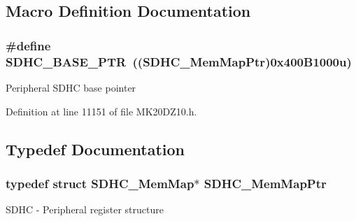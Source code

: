 \subsection{Macro Definition Documentation}
\subsubsection[{\texorpdfstring{S\+D\+H\+C\+\_\+\+B\+A\+S\+E\+\_\+\+P\+TR}{SDHC_BASE_PTR}}]{\setlength{\rightskip}{0pt plus 5cm}\#define S\+D\+H\+C\+\_\+\+B\+A\+S\+E\+\_\+\+P\+TR~(({\bf S\+D\+H\+C\+\_\+\+Mem\+Map\+Ptr})0x400\+B1000u)}\hypertarget{group___s_d_h_c___peripheral_gaf6d94732d48040eef799143f86be859c}{}\label{group___s_d_h_c___peripheral_gaf6d94732d48040eef799143f86be859c}
Peripheral S\+D\+HC base pointer 

Definition at line 11151 of file M\+K20\+D\+Z10.\+h.



\subsection{Typedef Documentation}
\subsubsection[{\texorpdfstring{S\+D\+H\+C\+\_\+\+Mem\+Map\+Ptr}{SDHC_MemMapPtr}}]{\setlength{\rightskip}{0pt plus 5cm}typedef struct {\bf S\+D\+H\+C\+\_\+\+Mem\+Map}$\ast$ {\bf S\+D\+H\+C\+\_\+\+Mem\+Map\+Ptr}}\hypertarget{group___s_d_h_c___peripheral_ga6da8531f7cf8afb4899b93b54ac58054}{}\label{group___s_d_h_c___peripheral_ga6da8531f7cf8afb4899b93b54ac58054}
S\+D\+HC -\/ Peripheral register structure 